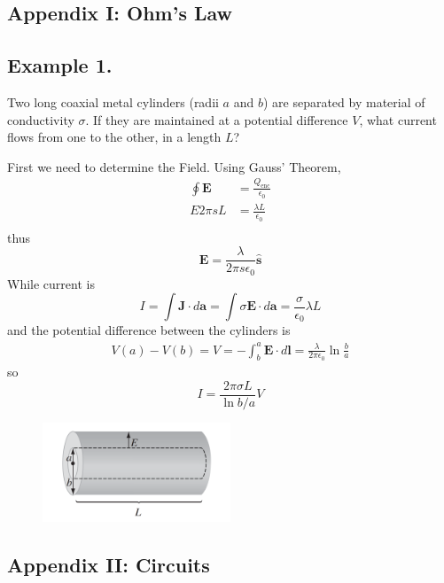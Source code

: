 \documentclass[../../../main.tex]{subfiles}
\begin{document}
\subsection*{Appendix I: Ohm's Law}
\subsection*{Example 1.} Two long coaxial metal cylinders (radii $a$ and $b$) are separated by material of conductivity $\sigma$. If they are maintained at a potential difference $V$, what current ﬂows from one to the other, in a length $L$?

First we need to determine the Field. Using Gauss' Theorem,
\begin{align*}
    \oint \mathbf{E}&=\frac{Q_\text{enc}}{\epsilon_0}\\
    E2\pi sL&=\frac{\lambda L}{\epsilon_0}\\
\end{align*}
thus
\begin{equation*}
    \mathbf{E}=\frac{\lambda}{2\pi s\epsilon_0}\mathbf{\hat{s}}
\end{equation*}
While current is
\begin{equation*}
    I=\int \mathbf{J}\cdot d\mathbf{a}=\int \sigma\mathbf{E}\cdot d\mathbf{a}=\frac{\sigma}{\epsilon_0}\lambda L
\end{equation*}
and the potential difference between the cylinders is
\begin{align*}
    V(a)-V(b)=V=-\int_{b}^{a}\mathbf{E}\cdot d\mathbf{l}=\frac{\lambda}{2\pi\epsilon_0}\ln \frac{b}{a}
\end{align*}
so
\begin{equation*}
    I=\frac{2\pi\sigma L}{\ln b/a}V
\end{equation*}
\begin{figure}[h]
    \centering
    \includegraphics[width=0.5\textwidth]{../Rss/Electromagnetism/Electrodynamics/Ohm.png}
\end{figure}

\subsection*{Appendix II: Circuits}
\end{document}

